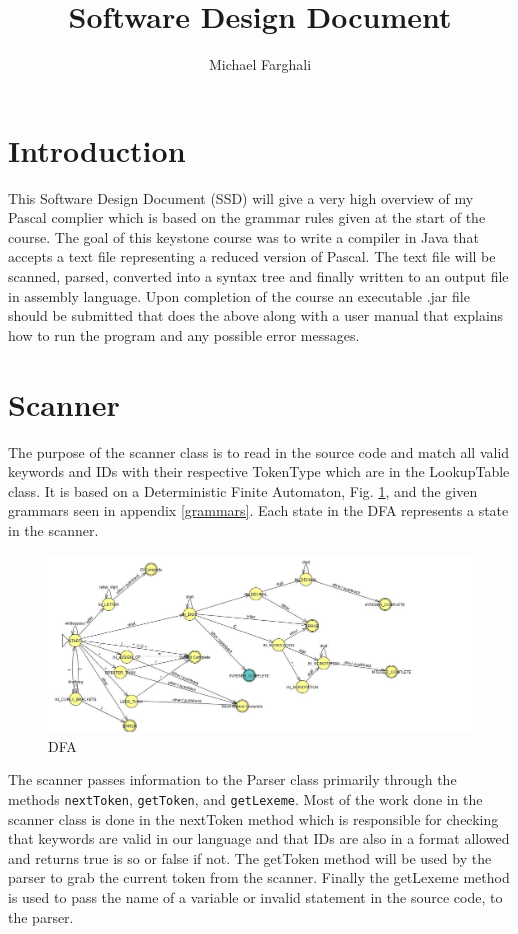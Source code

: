 \documentclass[10]{article}
\title{Software Design Document}
\author{Michael Farghali}
\begin{document}
\maketitle


\section{Introduction}
This Software Design Document (SSD) will give a very high overview of my Pascal complier which is based on the grammar rules given at the start of the course. The goal of this keystone course was to write a compiler in Java that accepts a text file representing a reduced version of Pascal. The text file will be scanned, parsed, converted into a syntax tree and finally written to an output file in assembly language. Upon completion of the course an executable .jar file should be submitted that does the above along with a user manual that explains how to run the program and any possible error messages. 
 
\section{Scanner}

The purpose of the scanner class is to read in the source code and match all valid keywords and IDs with their respective TokenType which are in the LookupTable class. It is based on a Deterministic Finite Automaton, Fig. \ref{fig: fg1}, and the given grammars seen in appendix \ref{grammars}. Each state in the DFA represents a state in the scanner. 
\begin{figure}[!ht]
	\includegraphics[width=\textwidth]{ScannerDFA.jpg}
	\caption{DFA \label{fig: fg1}}
	
\end{figure}

The scanner passes information to the Parser class primarily through the methods \verb|nextToken|, \verb|getToken|, and \verb|getLexeme|. Most of the work done in the scanner class is done in the nextToken method which is responsible for checking that keywords are valid in our language and that IDs are also in a format allowed and returns true is so or false if not. The getToken method will be used by the parser to grab the current token from the scanner. Finally the getLexeme method is used to pass the name of a variable or invalid statement in the source code, to the parser. 
\end{document}
